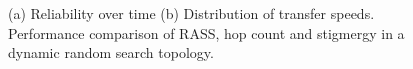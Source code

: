 \begin{figure}
    \centering
    \caption{(a) Reliability over time (b) Distribution of transfer speeds. Performance comparison of RASS, hop count and stigmergy in a dynamic random search topology.}
    \label{results:dynamicTopologyRandom}
    \vspace{-2mm}
\end{figure}



